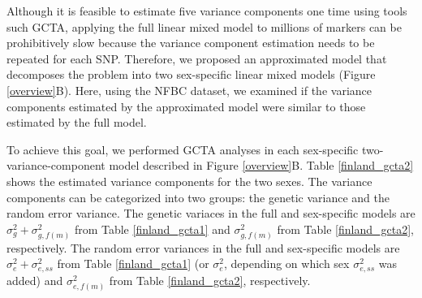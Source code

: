 \documentclass[11pt]{article}
\begin{document}
Although it is feasible to estimate five variance components one time using tools such GCTA, 
applying the full linear mixed model to millions of markers can be prohibitively slow
because the variance component estimation needs to be repeated for each SNP.
Therefore, we proposed an approximated model that decomposes the problem into two sex-specific linear mixed models (Figure \ref{overview}B).
Here, using the NFBC dataset, we examined if the variance components estimated by the approximated model
were similar to those estimated by the full model.


To achieve this goal, we performed GCTA analyses in each sex-specific two-variance-component model described in Figure \ref{overview}B. 
Table \ref{finland_gcta2} shows the estimated variance components for the two sexes.  
The variance components can be categorized into two groups: the genetic variance and the random error variance.
The genetic variaces in the full and sex-specific models are $\sigma^2_{g} + \sigma^2_{g,f(m)}$ from Table \ref{finland_gcta1} and $\sigma^2_{g,f(m)}$ from Table \ref{finland_gcta2}, respectively.
The random error variances in the full and sex-specific models are  $\sigma^2_{e} + \sigma^2_{e,ss}$ from Table \ref{finland_gcta1} (or $\sigma^2_{e}$, depending on which sex $\sigma^2_{e,ss}$ was added) and $\sigma^2_{e,f(m)}$ from Table \ref{finland_gcta2}, respectively. 
\end{document}
